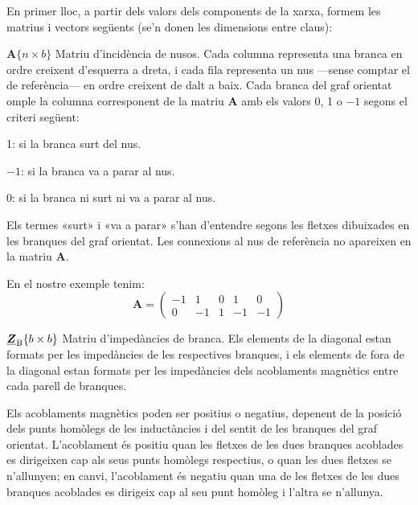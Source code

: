 En primer lloc, a partir dels valors dels components de la xarxa, formem les matrius i vectors següents (se'n donen les  dimensions entre claus):
\begin{list}{}
{\setlength{\labelwidth}{20mm} \setlength{\leftmargin}{22mm} \setlength{\labelsep}{2mm}}
   \item[$\boldsymbol{A}\{n\times b\}$] Matriu d'incidència de nusos. Cada columna representa una branca en ordre creixent d'esquerra a dreta, i cada fila representa un nus ---sense comptar el de referència--- en ordre creixent de dalt a baix. Cada branca del graf orientat omple la columna corresponent de la matriu $\boldsymbol{A}$ amb els valors 0, 1 o $-1$ segons el criteri següent:
   \begin{list}{}
   {\setlength{\labelwidth}{7mm} \setlength{\leftmargin}{9mm} \setlength{\labelsep}{2mm}}
      \item[1:]  si la branca surt del nus.
      \item[$-1$:] si la branca va a parar al nus.
      \item[0:]  si la branca ni surt ni va a parar al nus.
   \end{list}
   Els termes «surt» i «va a parar» s'han d'entendre segons les fletxes dibuixades en les branques del graf orientat. Les connexions al nus de referència no apareixen en la matriu $\boldsymbol{A}$.

   En el nostre exemple tenim:
   \[
      \boldsymbol{A} = \left(\begin{array}{rrrrr} -1 & 1  & 0 &  1 & 0 \\  0 & -1 & 1 & -1 & -1
                   \end{array} \right)
   \]

   \item[$\underline{\boldsymbol{Z}}_\mathrm{B}\{b\times b\}$] Matriu d'impedàncies de branca. Els elements de la diagonal estan formats per les impedàncies de les respectives branques, i els elements de fora de la diagonal estan formats per les impedàncies dels acoblaments magnètics entre cada parell de branques.

   Els acoblaments magnètics poden ser positius o negatius, depenent
    de la posició dels punts homòlegs de les inductàncies i del sentit
    de les branques del graf orientat. L'acoblament és positiu quan les
    fletxes de les dues branques acoblades es dirigeixen cap als seus punts
    homòlegs respectius, o quan les dues fletxes se n'allunyen; en canvi,
    l'acoblament és negatiu quan una de les fletxes de les dues branques
    acoblades es dirigeix cap al seu punt homòleg i l'altra se n'allunya.


\end{list}
